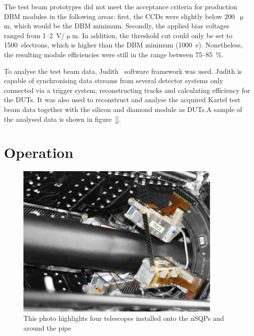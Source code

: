 \documentclass[12pt]{packages/mytustyle}  %
\begin{document}
The test beam prototypes did not meet the acceptance criteria for production DBM modules in the following areas: first, the CCDs were slightly below 200~$\upmu$m, which would be the DBM minimum. Secondly, the applied bias voltages ranged from 1--2~V/$\upmu$m. In addition, the threshold cut could only be set to 1500~electrons, which is higher than the DBM minimum (1000~e). Nonetheless, the resulting module efficiencies were still in the range between 75--85~\%.

To analyse the test beam data, Judith~\cite{} software framework was used. Judith is capable of synchronising data streams from several detector systems only connected via a trigger system, reconstructing tracks and calculating efficiency for the DUTs. It was also used to reconstruct and analyse the acquired Kartel test beam data together with the silicon and diamond module as DUTs.A sample of the analysed data is shown in figure~\ref{}. 



\section{Operation}
\label{sec:operation}
\begin{figure}[!t]
\centering
\includegraphics[width=0.9\textwidth]{pics/DBM-installed-colour1}
\caption{This photo highlights four telescopes installed onto the nSQPs and around the pipe}
\label{fig:dbminatlas}
\end{figure}
\end{document}

